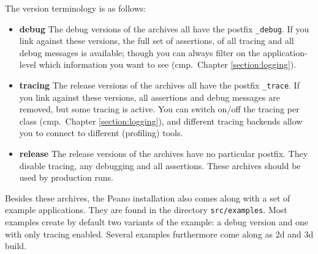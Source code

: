 The version terminology is as follows:
\begin{itemize}
  \item {\bf debug} The debug versions of the archives all have the postfix
  \texttt{\_debug}. If you link against these versions, the full set of
  assertions, of all tracing and all debug messages is available; though you can
  always filter on the application-level which information you want to see
  (cmp.~Chapter \ref{section:logging}).
  \item {\bf tracing} The release versions of the archives all have the postfix
  \texttt{\_trace}. If you link against these versions, all assertions and debug
  messages are removed, but some tracing is active. You can switch on/off the
  tracing per class (cmp.~Chapter \ref{section:logging}), and different tracing
  backends allow you to connect to different (profiling) tools.
  \item {\bf release} The release versions of the archives have no
  particular postfix. They disable tracing, any debugging and all assertions.
  These archives should be used by production runs.
\end{itemize}


\noindent
Besides these archives, the Peano installation also comes along with a set of
example applications.
They are found in the directory \texttt{src/examples}.
Most examples create by default two variants of the example: a debug
version and one with only tracing enabled.
Several examples furthermore come along as 2d and 3d build.




